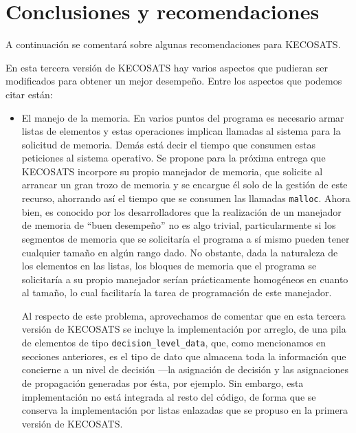 \documentclass[12pt,lettersize,oneside]{article}
\begin{document}
\section{Conclusiones y recomendaciones}

A continuación se comentará sobre algunas recomendaciones para KECOSATS.

En esta tercera versión de KECOSATS hay varios aspectos que pudieran ser
modificados para obtener un mejor desempeño. Entre los aspectos que podemos
citar están:
\begin{itemize}
\item El manejo de la memoria. En varios puntos del programa es necesario armar
  listas de elementos y estas operaciones implican llamadas al sistema para la
  solicitud de memoria. Demás está decir el tiempo que consumen estas peticiones
  al sistema operativo. Se propone para la próxima entrega que KECOSATS
  incorpore su propio manejador de memoria, que solicite al arrancar un gran
  trozo de memoria y se encargue él solo de la gestión de este recurso,
  ahorrando así el tiempo que se consumen las llamadas {\tt malloc}. Ahora bien,
  es conocido por los desarrolladores que la realización de un manejador de
  memoria de ``buen desempeño'' no es algo trivial, particularmente si los
  segmentos de memoria que se solicitaría el programa a sí mismo pueden tener
  cualquier tamaño en algún rango dado. No obstante, dada la naturaleza de los
  elementos en las listas, los bloques de memoria que el programa se solicitaría
  a su propio manejador serían prácticamente homogéneos en cuanto al tamaño, lo
  cual facilitaría la tarea de programación de este manejador.

  Al respecto de este problema, aprovechamos de comentar que en esta tercera
  versión de KECOSATS se incluye la implementación por arreglo, de una pila de
  elementos de tipo {\tt decision\_level\_data}, que, como mencionamos en
  secciones anteriores, es el tipo de dato que almacena toda la información que
  concierne a un nivel de decisión ---la asignación de decisión y las
  asignaciones de propagación generadas por ésta, por ejemplo. Sin embargo, esta
  implementación no está integrada al resto del código, de forma que se conserva
  la implementación por listas enlazadas que se propuso en la primera versión de
  KECOSATS.


\end{itemize}
\end{document}
